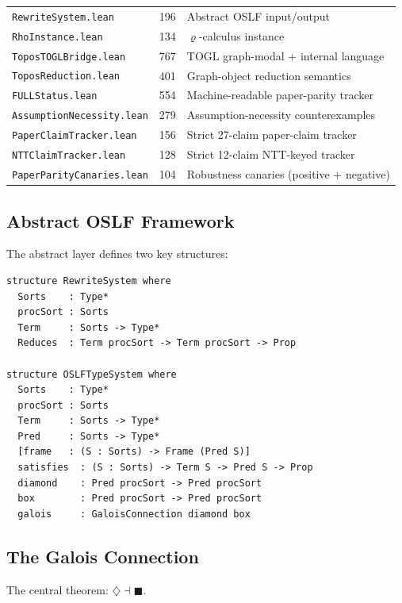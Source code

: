 \documentclass[]{article}
\newcommand{\code}[1]{\texttt{#1}}
\newcommand{\rhocalc}{\ensuremath{\varrho}}
\newcommand{\Dia}{\ensuremath{\diamondsuit}}
\newcommand{\Bx}{\ensuremath{\blacksquare}}
\newcommand{\OSLF}{\textup{OSLF}}
\begin{document}
\begin{center}
\begin{tabular}{lrl}
\code{RewriteSystem.lean}         &   196 & Abstract \OSLF{} input/output \\
\code{RhoInstance.lean}           &   134 & \rhocalc{}-calculus instance \\
\code{ToposTOGLBridge.lean}      &   767 & TOGL graph-modal + internal language \\
\code{ToposReduction.lean}       &   401 & Graph-object reduction semantics \\
\code{FULLStatus.lean}           &   554 & Machine-readable paper-parity tracker \\
\code{AssumptionNecessity.lean}  &   279 & Assumption-necessity counterexamples \\
\code{PaperClaimTracker.lean}    &   156 & Strict 27-claim paper-claim tracker \\
\code{NTTClaimTracker.lean}     &   128 & Strict 12-claim NTT-keyed tracker \\
\code{PaperParityCanaries.lean}  &   104 & Robustness canaries (positive + negative) \\
\end{tabular}
\end{center}

\subsection{Abstract \OSLF{} Framework}

The abstract layer defines two key structures:

\begin{lstlisting}[caption={The \OSLF{} input and output (RewriteSystem.lean)}]
structure RewriteSystem where
  Sorts    : Type*
  procSort : Sorts
  Term     : Sorts -> Type*
  Reduces  : Term procSort -> Term procSort -> Prop

structure OSLFTypeSystem where
  Sorts    : Type*
  procSort : Sorts
  Term     : Sorts -> Type*
  Pred     : Sorts -> Type*
  [frame   : (S : Sorts) -> Frame (Pred S)]
  satisfies  : (S : Sorts) -> Term S -> Pred S -> Prop
  diamond    : Pred procSort -> Pred procSort
  box        : Pred procSort -> Pred procSort
  galois     : GaloisConnection diamond box
\end{lstlisting}

\subsection{The Galois Connection}

The central theorem: $\Dia \dashv \Bx$.
\end{document}

